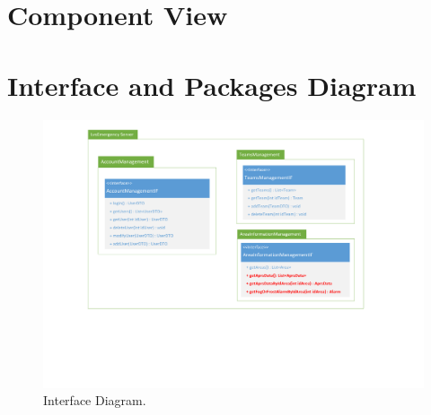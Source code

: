 \section{Component View}


\clearpage

\section{Interface and Packages Diagram}

\begin{figure}[h!]
	\centering
	\includegraphics[width=0.8\linewidth]{./Iterazione 3/OtherFiles/UML - Interface Diagram}
	\caption{Interface Diagram.}
\label{fig:InterfaceDiagram_iterazione3}
\end{figure}
